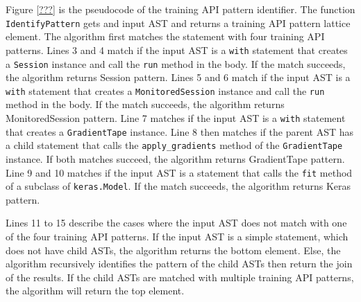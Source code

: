 Figure \ref{???} is the pseudocode of the training API pattern identifier.
The function {\tt IdentifyPattern} gets and input AST and returns a training
API pattern lattice element.
The algorithm first matches the statement with four training API patterns.
Lines 3 and 4 match if the input AST is a {\tt with} statement that
creates a {\tt Session} instance and call the {\tt run} method in the body.
If the match succeeds, the algorithm returns Session pattern.
Lines 5 and 6 match if the input AST is a {\tt with} statement that
creates a {\tt MonitoredSession} instance and call the {\tt run} method in the
body.
If the match succeeds, the algorithm returns MonitoredSession pattern.
Line 7 matches if the input AST is a {\tt with} statement that
creates a {\tt GradientTape} instance.
Line 8 then matches if the parent AST has a child statement that calls the
{\tt apply\_gradients} method of the {\tt GradientTape} instance.
If both matches succeed, the algorithm returns GradientTape pattern.
Line 9 and 10 matches if the input AST is a statement that calls
the {\tt fit} method of a subclass of {\tt keras.Model}. 
If the match succeeds, the algorithm returns Keras pattern.

Lines 11 to 15 describe the cases where the input AST does not match with 
one of the four training API patterns.
If the input AST is a simple statement, which does not have child ASTs,
the algorithm returns the bottom element.
Else, the algorithm recursively identifies the pattern of the child ASTs
then return the join of the results.
If the child ASTs are matched with multiple training API patterns, 
the algorithm will return the top element.

\pagebreak
